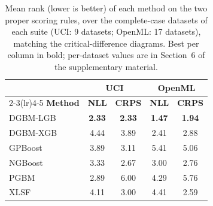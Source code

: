 \begin{table}[h!]
    \centering
    \caption{Mean rank (lower is better) of each method on the two proper scoring rules, over the complete-case datasets of each suite (UCI: 9 datasets; OpenML: 17 datasets), matching the critical-difference diagrams. Best per column in bold; per-dataset values are in Section~6 of the supplementary material.}
    \label{tab:rank_summary}
      \begin{tabular}{lcccc}
      \toprule
      & \multicolumn{2}{c}{\textbf{UCI}} & \multicolumn{2}{c}{\textbf{OpenML}} \\
      \cmidrule(lr){2-3}\cmidrule(lr){4-5}
      \textbf{Method} & \textbf{NLL} & \textbf{CRPS} & \textbf{NLL} & \textbf{CRPS} \\
      \midrule
      DGBM-LGB & \textbf{2.33} & \textbf{2.33} & \textbf{1.47} & \textbf{1.94} \\
      DGBM-XGB & 4.44 & 3.89 & 2.41 & 2.88 \\
      GPBoost & 3.89 & 3.11 & 5.41 & 5.06 \\
      NGBoost & 3.33 & 2.67 & 3.00 & 2.76 \\
      PGBM & 2.89 & 6.00 & 4.29 & 5.76 \\
      XLSF & 4.11 & 3.00 & 4.41 & 2.59 \\
      \bottomrule
      \end{tabular}
\end{table}
